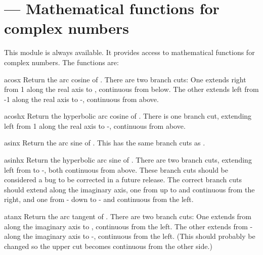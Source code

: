 \section{ ---
         Mathematical functions for complex numbers}


This module is always available.  It provides access to mathematical
functions for complex numbers.  The functions are:

\begin{funcdesc}{acos}{x}
Return the arc cosine of .
There are two branch cuts:
One extends right from 1 along the real axis to \infinity, continuous
from below.
The other extends left from -1 along the real axis to -\infinity,
continuous from above.
\end{funcdesc}

\begin{funcdesc}{acosh}{x}
Return the hyperbolic arc cosine of .
There is one branch cut, extending left from 1 along the real axis
to -\infinity, continuous from above.
\end{funcdesc}

\begin{funcdesc}{asin}{x}
Return the arc sine of .
This has the same branch cuts as .
\end{funcdesc}

\begin{funcdesc}{asinh}{x}
Return the hyperbolic arc sine of .
There are two branch cuts, extending left from \plusminus{} to
\plusminus-\infinity{}, both continuous from above.
These branch cuts should be considered a bug to be corrected in a
future release.
The correct branch cuts should extend along the imaginary axis,
one from  up to \infinity{} and continuous from the
right, and one from - down to -\infinity{} and
continuous from the left.
\end{funcdesc}

\begin{funcdesc}{atan}{x}
Return the arc tangent of .
There are two branch cuts:
One extends from  along the imaginary axis to
\infinity{}, continuous from the left.
The other extends from - along the imaginary axis to
-\infinity{}, continuous from the left.
(This should probably be changed so the upper cut becomes continuous
from the other side.)
\end{funcdesc}

